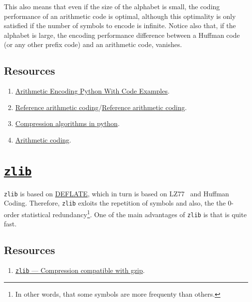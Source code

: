 This also means that even if the size of the alphabet is small, the
coding performance of an arithmetic code is optimal, although this
optimality is only satisfied if the number of symbols to encode is
infinite. Notice also that, if the alphabet is large, the
encoding performance difference between a Huffman code (or any other
prefix code) and an arithmetic code, vanishes.

\subsection*{Resources}
\begin{enumerate}
\item
  \href{https://www.folkstalk.com/tech/arithmetic-encoding-python-with-code-examples/}{Arithmetic
    Encoding Python With Code Examples}.
\item \href{https://www.nayuki.io/page/reference-arithmetic-coding}{Reference arithmetic coding}/\href{https://github.com/nayuki/Reference-arithmetic-coding}{Reference arithmetic coding}.
\item \href{https://www.inference.org.uk/mackay/python/compress/#AC}{Compression algorithms in python}.
\item \href{https://github.com/vicente-gonzalez-ruiz/arithmetic_coding}{Arithmetic coding}.
\end{enumerate}

\section{\href{https://zlib.net/}{\texttt{zlib}}}

\texttt{zlib} is based on
\href{https://en.wikipedia.org/wiki/Deflate}{DEFLATE}, which in turn
is based on LZ77~\cite{vruiz__LZW} and Huffman Coding. Therefore,
\texttt{zlib} exloits the repetition of symbols and also, the the
0-order statistical redundancy\footnote{In other words, that some
  symbols are more frequenty than others.}. One of the main advantages
of \texttt{zlib} is that is quite fast.

\subsection*{Resources}
\begin{enumerate}
\item \href{https://docs.python.org/3/library/zlib.html}{\texttt{zlib}
    — Compression compatible with gzip}.
\end{enumerate}

